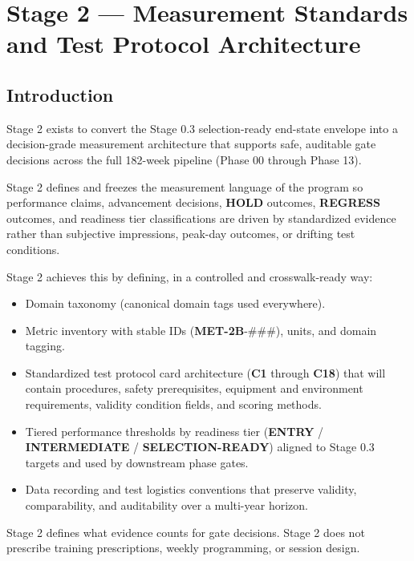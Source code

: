 \documentclass[10pt]{article}
\begin{document}
\section*{Stage 2 — Measurement Standards and Test Protocol Architecture}
{}

\subsection*{Introduction}
{}

Stage 2 exists to convert the Stage 0.3 selection-ready end-state envelope into a decision-grade measurement architecture that supports safe, auditable gate decisions across the full 182-week pipeline (Phase 00 through Phase 13).

Stage 2 defines and freezes the measurement language of the program so performance claims, advancement decisions, \textbf{HOLD} outcomes, \textbf{REGRESS} outcomes, and readiness tier classifications are driven by standardized evidence rather than subjective impressions, peak-day outcomes, or drifting test conditions.

Stage 2 achieves this by defining, in a controlled and crosswalk-ready way:

\begin{itemize}
\item Domain taxonomy (canonical domain tags used everywhere).
\item Metric inventory with stable IDs (\textbf{MET-2B}-\#\#\#), units, and domain tagging.
\item Standardized test protocol card architecture (\textbf{C1} through \textbf{C18}) that will contain procedures, safety prerequisites, equipment and environment requirements, validity condition fields, and scoring methods.
\item Tiered performance thresholds by readiness tier (\textbf{ENTRY} / \textbf{INTERMEDIATE} / \textbf{SELECTION-READY}) aligned to Stage 0.3 targets and used by downstream phase gates.
\item Data recording and test logistics conventions that preserve validity, comparability, and auditability over a multi-year horizon.
\end{itemize}

Stage 2 defines what evidence counts for gate decisions. Stage 2 does not prescribe training prescriptions, weekly programming, or session design.
\end{document}
